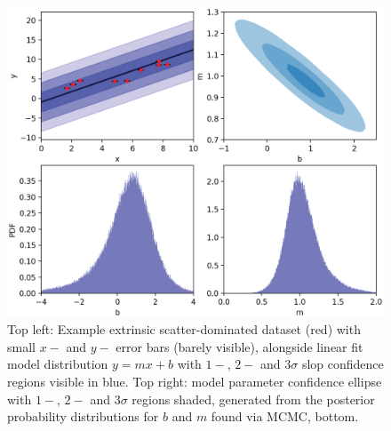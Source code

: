 
\begin{figure}
    \centering
    \includegraphics[width=1.0\linewidth]{figures/linfit_sloppy_3shadenoback.eps}
    \caption{Top left: Example extrinsic scatter-dominated dataset (red) with small $x-$ and $y-$ error bars (barely visible), alongside linear fit model distribution $y=mx+b$ with $1-$, $2-$ and $3\sigma$ slop confidence regions visible in blue. Top right: model parameter confidence ellipse with $1-$, $2-$ and $3\sigma$ regions shaded, generated from the posterior probability distributions for $b$ and $m$ found via MCMC, bottom.}
    \label{fig:linfit}
\end{figure}

